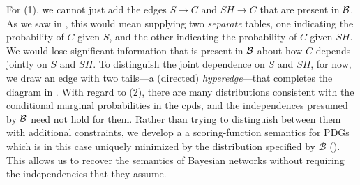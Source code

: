 \documentclass[letterpaper]{article} %
\theoremstyle{plain}
\theoremstyle{definition}
\theoremstyle{remark}
\newcommand{\dg}[1]{\mathbdcal{#1}}
\newcommand{\PDGof}[1]{{\dg M}_{#1}}
\begin{document}
\begin{example}[emulating a BN]
For (1), we cannot just add the edges $S \to C$ and $SH \to C$ that are present
in $\cal B$. As we saw in , this would mean
supplying two \emph{separate} tables, one indicating the probability of $C$
given $S$, and the other indicating the probability of $C$ given
$\mathit{SH}$.  We would lose significant information that is
present in $\cal B$  about 
how $C$ depends jointly on $S$ and $SH$. To distinguish the joint dependence on
$S$ and $\mathit{SH}$, for now, we draw an edge with two tails---a
(directed)
\emph{hyperedge}---that completes the diagram in . 
%
With regard to (2), there are many distributions consistent with the conditional
marginal probabilities in the cpds, and the independences presumed by $\cal B$
need not hold for them. 
Rather than trying to distinguish between them with additional constraints,
we develop a a scoring-function semantics for PDGs
which 
is in this case uniquely minimized by the distribution 
%
specified by ${\mathcal B}$ ().
This allows us to recover the semantics of Bayesian networks without requiring the independencies that they assume.


\end{example}
\end{document}
